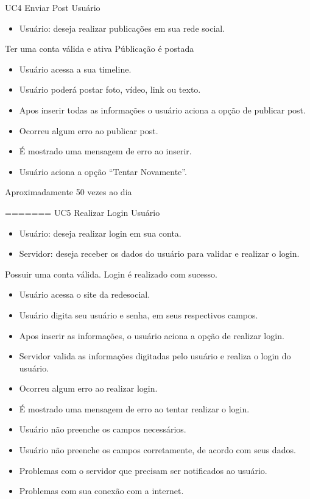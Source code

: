 \casoDeUso
{UC4}
{Enviar Post}
{Usuário}
{
\begin{itemize}
	\item Usuário: deseja realizar publicações em sua rede social.
\end{itemize}

}
{Ter uma conta válida e ativa}
{Públicação é postada}
{
\begin{itemize}
\item Usuário acessa a sua timeline.
\item Usuário poderá postar foto, vídeo, link ou texto.
\item Apos inserir todas as informações o usuário aciona a opção de publicar post.
\end{itemize}
}
{
\begin{itemize}
\item Ocorreu algum erro ao publicar post.
\item É mostrado uma mensagem de erro ao inserir.
\item Usuário aciona a opção “Tentar Novamente”.
\end{itemize}
}
{Aproximadamente 50 vezes ao dia}
{

}
=======
\casoDeUso
{UC5}
{Realizar Login}
{Usuário}
{
\begin{itemize}
	\item Usuário: deseja realizar login em sua conta.
	\item Servidor: deseja receber os dados do usuário para validar e realizar o login.
\end{itemize}

}
{Possuir uma conta válida.}
{Login é realizado com sucesso.}
{
\begin{itemize}
\item Usuário acessa o site da redesocial.
\item Usuário digita seu usuário e senha, em seus respectivos campos.
\item Apos inserir as informações, o usuário aciona a opção de realizar login.
\item Servidor valida as informações digitadas pelo usuário e realiza o login do usuário.
\end{itemize}
}
{
\begin{itemize}
\item Ocorreu algum erro ao realizar login.
\item É mostrado uma mensagem de erro ao tentar realizar o login.
\item Usuário não preenche os campos necessários.
\item Usuário não preenche os campos corretamente, de acordo com seus dados.
\item Problemas com o servidor que precisam ser notificados ao usuário.
\item Problemas com sua conexão com a internet.
\end{itemize}
}
